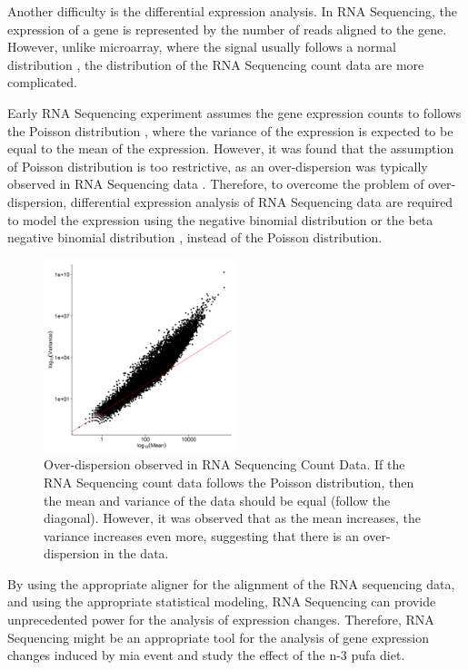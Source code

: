 \documentclass[12pt]{scrbook}
\begin{document}
Another difficulty is the differential expression analysis. 
In RNA Sequencing, the expression of a gene is represented by the number of reads aligned to the gene. 
However, unlike microarray, where the signal usually follows a normal distribution \citep{Hoyle2002,Giles2003}, the distribution of the RNA Sequencing count data are more complicated.

Early RNA Sequencing experiment assumes the gene expression counts to follows the Poisson distribution \citep{Marioni2008}, where the variance of the expression is expected to be equal to the mean of the expression.
However, it was found that the assumption of Poisson distribution is too restrictive, as an over-dispersion was typically observed in RNA Sequencing data \citep{Anders2010}.
Therefore, to overcome the problem of over-dispersion, differential expression analysis of RNA Sequencing data are required to model the expression using the negative binomial distribution \citep{Anders2010,Robinson2010} or the beta negative binomial distribution \citep{Trapnell2012}, instead of the Poisson distribution.
	\begin{figure}
		\centering
		\includegraphics[width=0.5\textwidth]{figure/overdispersion.png}
		\caption[Over-dispersion observed in RNA Sequencing Count Data]{
			Over-dispersion observed in RNA Sequencing Count Data.
			If the RNA Sequencing count data follows the Poisson distribution, then the mean and variance of the data should be equal (follow the diagonal). 
			However, it was observed that as the mean increases, the variance increases even more, suggesting that there is an over-dispersion in the data. 
		}
	\end{figure}
	
By using the appropriate aligner for the alignment of the RNA sequencing data, and using the appropriate statistical modeling, RNA Sequencing can provide unprecedented power for the analysis of expression changes.
Therefore, RNA Sequencing might be an appropriate tool for the analysis of gene expression changes induced by \gls{mia} event and study the effect of the n-3 \gls{pufa} diet. 
\end{document}
